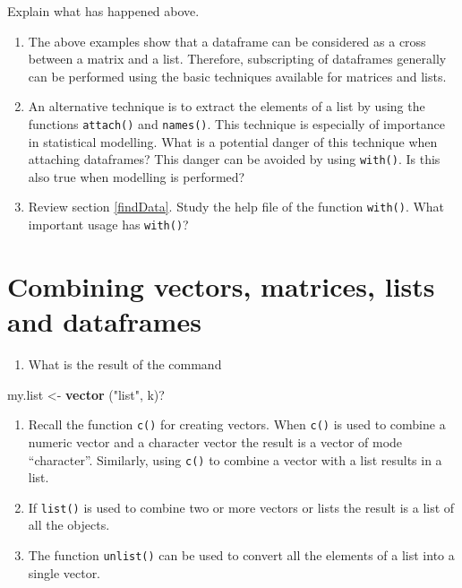 \documentclass[
]{book}
\newenvironment{Shaded}{\begin{snugshade}}{\end{snugshade}}
\newcommand{\FunctionTok}[1]{\textcolor[rgb]{0.13,0.29,0.53}{\textbf{#1}}}
\newcommand{\NormalTok}[1]{#1}
\newcommand{\OtherTok}[1]{\textcolor[rgb]{0.56,0.35,0.01}{#1}}
\newcommand{\StringTok}[1]{\textcolor[rgb]{0.31,0.60,0.02}{#1}}
\providecommand{\tightlist}{%
  \setlength{\itemsep}{0pt}\setlength{\parskip}{0pt}}
\begin{document}
Explain what has happened above.

\begin{enumerate}
\def\labelenumi{(\alph{enumi})}
\setcounter{enumi}{4}
\item
  The above examples show that a dataframe can be considered as a cross between a matrix and a list. Therefore, subscripting of dataframes generally can be performed using the basic techniques available for matrices and lists.
\item
  An alternative technique is to extract the elements of a list by using the functions \texttt{attach()} and \texttt{names()}. This technique is especially of importance in statistical modelling. What is a potential danger of this technique when attaching dataframes? This danger can be avoided by using \texttt{with()}. Is this also true when modelling is performed?
\item
  Review section \ref{findData}. Study the help file of the function \texttt{with()}. What important usage has \texttt{with()}?
\end{enumerate}

\section{Combining vectors, matrices, lists and dataframes}\label{combining-vectors-matrices-lists-and-dataframes}

\begin{enumerate}
\def\labelenumi{(\alph{enumi})}
\tightlist
\item
  What is the result of the command
\end{enumerate}

\begin{Shaded}
\begin{Highlighting}[]
\NormalTok{my.list }\OtherTok{\textless{}{-}} \FunctionTok{vector}\NormalTok{ (}\StringTok{"list"}\NormalTok{, k)?}
\end{Highlighting}
\end{Shaded}

\begin{enumerate}
\def\labelenumi{(\alph{enumi})}
\setcounter{enumi}{1}
\item
  Recall the function \texttt{c()} for creating vectors. When \texttt{c()} is used to combine a numeric vector and a character vector the result is a vector of mode ``character''. Similarly, using \texttt{c()} to combine a vector with a list results in a list.
\item
  If \texttt{list()} is used to combine two or more vectors or lists the result is a list of all the objects.
\item
  The function \texttt{unlist()} can be used to convert all the elements of a list into a single vector.
\end{enumerate}
\end{document}
